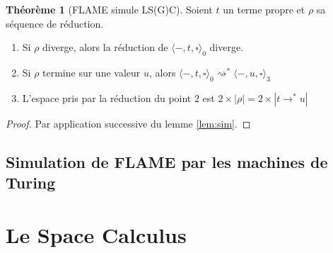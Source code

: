 \documentclass[11pt,a4paper]{article}
\theoremstyle{definition}
\newtheorem{theorem}{Théorème}[section]
\newcommand{\etatz}[1]{\langle #1 \rangle_0}
\newcommand{\etatt}[1]{\langle #1 \rangle_3}
\newcommand{\ra}{\rightarrow}
\newcommand{\rsa}{\rightsquigarrow}
\begin{document}
\begin{theorem}[FLAME simule LS(G)C]
  Soient $t$ un terme propre et $\rho$ sa séquence de réduction. 
  \begin{enumerate}
    \item Si $\rho$ diverge, alors la réduction de $\etatz{-, t, \square}$ diverge. 
    \item Si $\rho$ termine sur une valeur $u$, alors $\etatz{-, t, \square} \rsa^{*} \etatt{-, u, \square}$
    \item L'espace pris par la réduction du point 2 est $2 \times |\rho| = 2 \times |t \ra^* u|$
  \end{enumerate}

\end{theorem}
\begin{proof}
  Par application successive du lemme \ref{lem:sim}.
\end{proof}

\subsection{Simulation de FLAME par les machines de Turing}

\section{Le Space Calculus}
\end{document}
